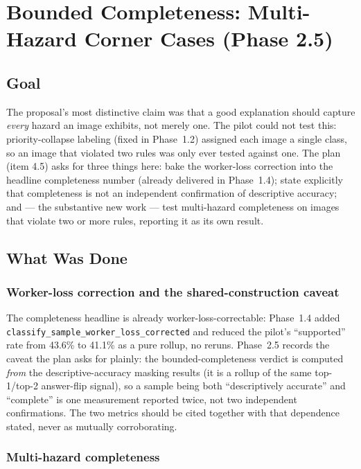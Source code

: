\chapter{Bounded Completeness: Multi-Hazard Corner Cases (Phase 2.5)}
\label{chap:p2-5}

\section{Goal}

The proposal's most distinctive claim was that a good explanation should capture \emph{every} hazard an
image exhibits, not merely one. The pilot could not test this: priority-collapse labeling (fixed in
Phase~1.2) assigned each image a single class, so an image that violated two rules was only ever tested
against one. The plan (item 4.5) asks for three things here: bake the worker-loss correction into the
headline completeness number (already delivered in Phase~1.4); state explicitly that completeness is
not an independent confirmation of descriptive accuracy; and --- the substantive new work --- test
multi-hazard completeness on images that violate two or more rules, reporting it as its own result.

\section{What Was Done}

\subsection{Worker-loss correction and the shared-construction caveat}

The completeness headline is already worker-loss-correctable: Phase~1.4 added
\texttt{classify\_sample\_worker\_loss\_corrected} and reduced the pilot's ``supported'' rate from
43.6\% to 41.1\% as a pure rollup, no reruns. Phase~2.5 records the caveat the plan asks for plainly:
the bounded-completeness verdict is computed \emph{from} the descriptive-accuracy masking results (it is
a rollup of the same top-1/top-2 answer-flip signal), so a sample being both ``descriptively accurate''
and ``complete'' is one measurement reported twice, not two independent confirmations. The two metrics
should be cited together with that dependence stated, never as mutually corroborating.

\subsection{Multi-hazard completeness}

